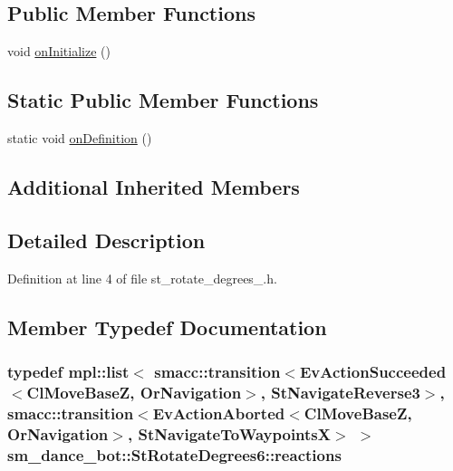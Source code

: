 \subsection*{Public Member Functions}
\begin{DoxyCompactItemize}
\item 
void \hyperlink{structsm__dance__bot_1_1StRotateDegrees6_ac6bbf8ae2f6d6696c7dee7a8846a8bff}{on\+Initialize} ()
\end{DoxyCompactItemize}
\subsection*{Static Public Member Functions}
\begin{DoxyCompactItemize}
\item 
static void \hyperlink{structsm__dance__bot_1_1StRotateDegrees6_a74c6db98216d664a2aeaa89a08a07600}{on\+Definition} ()
\end{DoxyCompactItemize}
\subsection*{Additional Inherited Members}


\subsection{Detailed Description}


Definition at line 4 of file st\+\_\+rotate\+\_\+degrees\+\_.\+h.



\subsection{Member Typedef Documentation}
\subsubsection[{\texorpdfstring{reactions}{reactions}}]{\setlength{\rightskip}{0pt plus 5cm}typedef mpl\+::list$<$ {\bf smacc\+::transition}$<$Ev\+Action\+Succeeded$<${\bf Cl\+Move\+BaseZ}, {\bf Or\+Navigation}$>$, {\bf St\+Navigate\+Reverse3}$>$, {\bf smacc\+::transition}$<$Ev\+Action\+Aborted$<${\bf Cl\+Move\+BaseZ}, {\bf Or\+Navigation}$>$, {\bf St\+Navigate\+To\+WaypointsX}$>$ $>$ {\bf sm\+\_\+dance\+\_\+bot\+::\+St\+Rotate\+Degrees6\+::reactions}}\hypertarget{structsm__dance__bot_1_1StRotateDegrees6_a2213d13d3f0ffd8d11e4f33151e4b840}{}\label{structsm__dance__bot_1_1StRotateDegrees6_a2213d13d3f0ffd8d11e4f33151e4b840}


